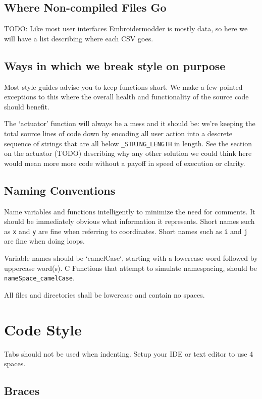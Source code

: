 \subsection{Where Non-compiled Files Go}

TODO: Like most user interfaces Embroidermodder is mostly data, so here we will have a list describing where each CSV goes.

\subsection{Ways in which we break style on purpose}

Most style guides advise you to keep functions short. We make a few pointed exceptions to this where the overall health and functionality of the source code should benefit.

The `actuator' function will always be a mess and it should be: we're keeping the total source lines of code down by encoding all user action into a descrete sequence of strings that are all below \texttt{\_STRING\_LENGTH} in length. See the section on the actuator (TODO) describing why any other solution we could think  here would mean more more code without a payoff in speed of execution or clarity.

\subsection{Naming Conventions}

Name variables and functions intelligently to minimize the need for comments. It should be immediately obvious what information it represents. Short names such as \texttt{x} and \texttt{y} are fine when referring to coordinates. Short names such as \texttt{i} and \texttt{j} are fine when doing loops.

Variable names should be `camelCase`, starting with a lowercase word followed by uppercase word(s). C Functions that attempt to simulate namespacing, should be \texttt{nameSpace\_camelCase}.

All files and directories shall be lowercase and contain no spaces.

\section{Code Style}

Tabs should not be used when indenting. Setup your IDE or text editor to use 4 spaces.

\subsection{Braces}

